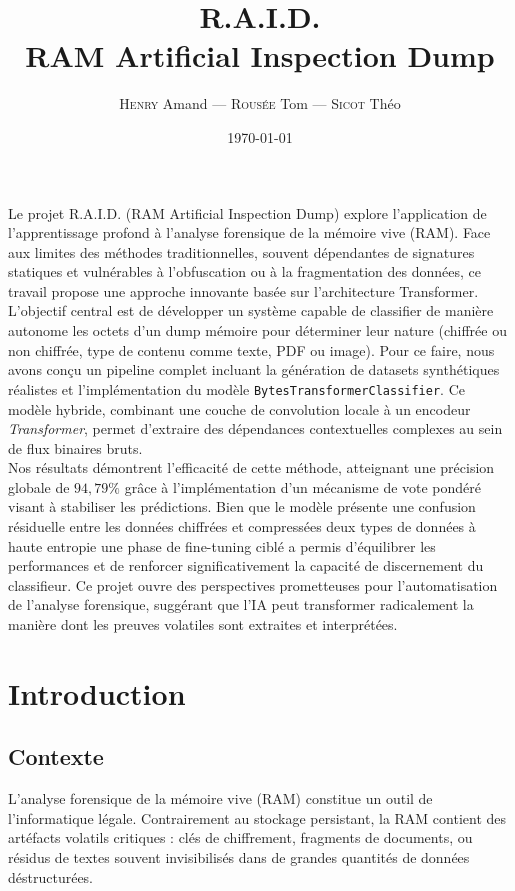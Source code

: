 \documentclass[12pt]{report}
\title{R.A.I.D. \\ \large RAM Artificial Inspection Dump}
\author{\textsc{Henry} Amand --- \textsc{Rousée} Tom --- \textsc{Sicot} Théo}
\date{\today}
\begin{document}
    \makeCustomTitle
    
    \begin{customabstract}
    Le projet R.A.I.D. (RAM Artificial Inspection Dump) explore l'application de l'apprentissage profond à l'analyse forensique de la mémoire vive (RAM). Face aux limites des méthodes traditionnelles, souvent dépendantes de signatures statiques et vulnérables à l'obfuscation ou à la fragmentation des données, ce travail propose une approche innovante basée sur l'architecture Transformer.\\

    L'objectif central est de développer un système capable de classifier de manière autonome les octets d'un dump mémoire pour déterminer leur nature (chiffrée ou non chiffrée, type de contenu comme texte, PDF ou image). Pour ce faire, nous avons conçu un pipeline complet incluant la génération de datasets synthétiques réalistes et l'implémentation du modèle \texttt{BytesTransformerClassifier}. Ce modèle hybride, combinant une couche de convolution locale à un encodeur \textit{Transformer}, permet d'extraire des dépendances contextuelles complexes au sein de flux binaires bruts.\\

    Nos résultats démontrent l'efficacité de cette méthode, atteignant une précision globale de $94,79\%$ grâce à l'implémentation d'un mécanisme de vote pondéré visant à stabiliser les prédictions. Bien que le modèle présente une confusion résiduelle entre les données chiffrées et compressées deux types de données à haute entropie une phase de fine-tuning ciblé a permis d'équilibrer les performances et de renforcer significativement la capacité de discernement du classifieur. Ce projet ouvre des perspectives prometteuses pour l'automatisation de l'analyse forensique, suggérant que l'IA peut transformer radicalement la manière dont les preuves volatiles sont extraites et interprétées.
    \end{customabstract}

    \tableofcontents
    \newpage

    \chapter{Introduction}\label{chap:introduction}
    \section{Contexte}\label{sec:contexte}
    L'analyse forensique de la mémoire vive (RAM) constitue un outil de l'informatique légale. Contrairement au stockage persistant, la RAM contient des artéfacts volatils critiques : clés de chiffrement, fragments de documents, ou résidus de textes souvent invisibilisés dans de grandes quantités de données déstructurées.\\
\end{document}
